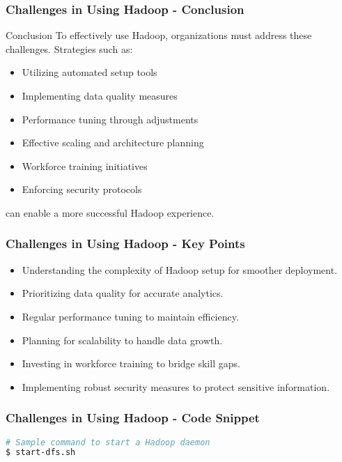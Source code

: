 \documentclass[aspectratio=169]{beamer}
\begin{document}
\begin{frame}[fragile]
    \frametitle{Challenges in Using Hadoop - Conclusion}
    \begin{block}{Conclusion}
        To effectively use Hadoop, organizations must address these challenges. Strategies such as:
        \begin{itemize}
            \item Utilizing automated setup tools
            \item Implementing data quality measures
            \item Performance tuning through adjustments
            \item Effective scaling and architecture planning
            \item Workforce training initiatives
            \item Enforcing security protocols
        \end{itemize}
        can enable a more successful Hadoop experience.
    \end{block}
\end{frame}

\begin{frame}[fragile]
    \frametitle{Challenges in Using Hadoop - Key Points}
    \begin{itemize}
        \item Understanding the complexity of Hadoop setup for smoother deployment.
        \item Prioritizing data quality for accurate analytics.
        \item Regular performance tuning to maintain efficiency.
        \item Planning for scalability to handle data growth.
        \item Investing in workforce training to bridge skill gaps.
        \item Implementing robust security measures to protect sensitive information.
    \end{itemize}
\end{frame}

\begin{frame}[fragile]
    \frametitle{Challenges in Using Hadoop - Code Snippet}
    \begin{lstlisting}[language=bash]
# Sample command to start a Hadoop daemon
$ start-dfs.sh
    \end{lstlisting}
\end{frame}

\begin{frame}[fragile]
    \titlepage
\end{frame}
\end{document}
